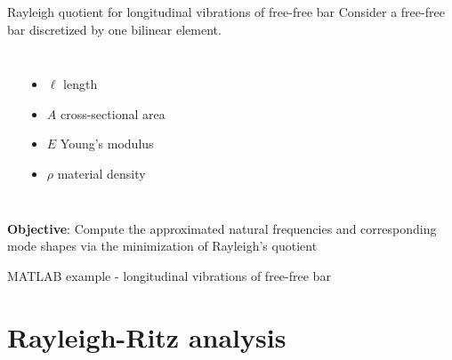 \documentclass[aspectratio=169]{beamer}
\begin{document}
\begin{frame}{Rayleigh quotient for longitudinal vibrations of free-free bar}
  Consider a free-free bar discretized by one bilinear element.
  \begin{columns}
    \begin{center}
    \end{center}
    {\small \begin{itemize}
        \item $\ell$ length
        \item $A$ cross-sectional area
        \item $E$ Young's modulus
        \item $\rho$ material density
      \end{itemize}}
  \end{columns}
  \begin{block}{}
    \textbf{Objective}:\newline\noindent
    Compute the approximated natural frequencies and corresponding mode shapes via the minimization of Rayleigh's quotient
  \end{block}
\end{frame}

\begin{frame}{MATLAB example - longitudinal vibrations of free-free bar}
  \begin{center}
    \href{https://drive.mathworks.com/sharing/6a9792ef-d0a7-4aca-a1d0-8b1862b0ac3b}{}
  \end{center}
\end{frame}

\section{Rayleigh-Ritz analysis}
\end{document}
